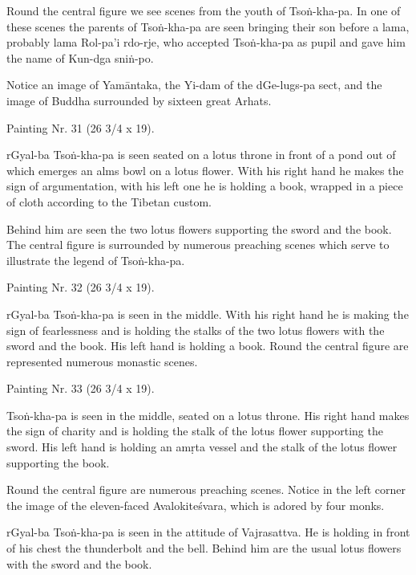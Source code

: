 \documentclass[a4paper, 12pt, oneside]{article}
\begin{document}
Round the central figure we see scenes from the youth of Tso\.{n}-kha-pa. In one of these scenes the parents of Tso\.{n}-kha-pa are seen bringing their son before a lama, probably lama Rol-pa'i rdo-rje, who accepted Tso\.{n}-kha-pa as pupil and gave him the name of Kun-dga sni\.{n}-po.

Notice an image of Yam\={a}ntaka, the Yi-dam of the dGe-lugs-pa sect, and the image of Buddha surrounded by sixteen great Arhats.

\bigskip

Painting Nr. 31 (26 3/4 x 19).

\bigskip

rGyal-ba Tso\.{n}-kha-pa is seen seated on a lotus throne in front of a pond out of which emerges an alms bowl on a lotus flower. With his right hand he makes the sign of argumentation, with his left one he is holding a book, wrapped in a piece of cloth according to the Tibetan custom.

Behind him are seen the two lotus flowers supporting the sword and the book. The central figure is surrounded by numerous preaching scenes which serve to illustrate the legend of Tso\.{n}-kha-pa.

\bigskip

Painting Nr. 32 (26 3/4 x 19).

\bigskip

rGyal-ba Tso\.{n}-kha-pa is seen in the middle. With his right hand he is making the sign of fearlessness and is holding the stalks of the two lotus flowers with the sword and the book. His left hand is holding a book. Round the central figure are represented numerous monastic scenes.

\bigskip

Painting Nr. 33 (26 3/4 x 19).

\bigskip

Tso\.{n}-kha-pa is seen in the middle, seated on a lotus throne. His right hand makes the sign of charity and is holding the stalk of the lotus flower supporting the sword. His left hand is holding an am\d{r}ta vessel and the stalk of the lotus flower supporting the book.

Round the central figure are numerous preaching scenes. Notice in the left corner the image of the eleven-faced Avalokite\'{s}vara, which is adored by four monks.

rGyal-ba Tso\.{n}-kha-pa is seen in the attitude of Vajrasattva. He is holding in front of his chest the thunderbolt and the bell. Behind him are the usual lotus flowers with the sword and the book.
\end{document}
